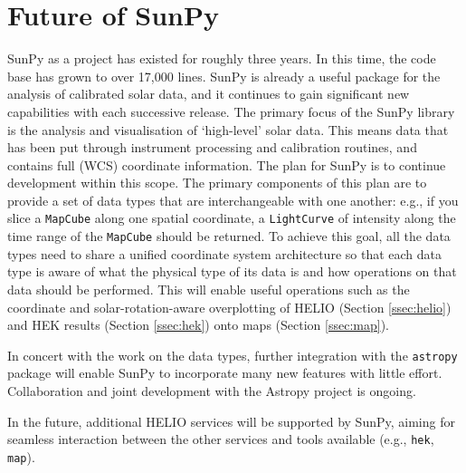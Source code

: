 \section{Future of SunPy}\label{sec:future}

SunPy as a project has existed for roughly three years. In this time, 
the code base has grown to over 17,000 lines. SunPy is already a 
useful package for the analysis of calibrated solar data, and it
continues to gain significant new capabilities with each successive release.
The primary focus of the 
SunPy library is the analysis and visualisation of `high-level' solar 
data. This means data that has been put through instrument processing 
and 
calibration routines, and contains full (WCS) coordinate information. 
The plan for SunPy is to continue development within this 
scope. The 
primary components of this plan are to provide a set of data types 
that are 
interchangeable with one another: e.g., if you slice a 
\texttt{MapCube} 
along one spatial coordinate, a \texttt{LightCurve} of intensity along the 
time range of 
the \texttt{MapCube} should be returned. To achieve this goal, all the 
data 
types need to share a unified coordinate system architecture so that 
each data 
type is aware of what the physical type of its data is and how 
operations on 
that data should be performed. This will enable useful operations
such as the coordinate and solar-rotation-aware 
overplotting of HELIO (Section \ref{ssec:helio}) and HEK
results (Section \ref{ssec:hek}) onto maps (Section \ref{ssec:map}).

In concert with the work on the data types, further integration with 
the 
\texttt{astropy} package will enable SunPy to incorporate many new features
with little effort. Collaboration and joint development with the 
Astropy project \citep{theastropycollaboration2013} is ongoing.

In the future, additional HELIO services will be supported by SunPy, aiming for
seamless interaction between the other services and tools available (e.g., 
\texttt{hek}, \texttt{map}).  